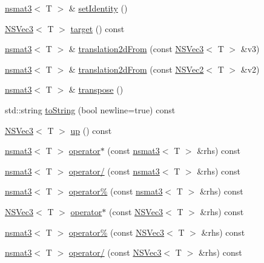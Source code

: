 \begin{DoxyCompactItemize}
\item 
\hyperlink{structnsmat3}{nsmat3}$<$ T $>$ \& \hyperlink{structnsmat3_a7493076bf442d798748ef5eae2d7d981}{set\-Identity} ()
\item 
\hyperlink{structNSVec3}{N\-S\-Vec3}$<$ T $>$ \hyperlink{structnsmat3_afa4d115852694f7da5b693a5ab52da8e}{target} () const 
\item 
\hyperlink{structnsmat3}{nsmat3}$<$ T $>$ \& \hyperlink{structnsmat3_a0ba7b5656e167d41176fd3bfc8b956fa}{translation2d\-From} (const \hyperlink{structNSVec3}{N\-S\-Vec3}$<$ T $>$ \&v3)
\item 
\hyperlink{structnsmat3}{nsmat3}$<$ T $>$ \& \hyperlink{structnsmat3_ac4d5172fb1936e1de9f8a34eb43c82dc}{translation2d\-From} (const \hyperlink{structNSVec2}{N\-S\-Vec2}$<$ T $>$ \&v2)
\item 
\hyperlink{structnsmat3}{nsmat3}$<$ T $>$ \& \hyperlink{structnsmat3_acb03f6c3876937eb0b8e3eac7225a16d}{transpose} ()
\item 
std\-::string \hyperlink{structnsmat3_a429c08006127a30402dee22058586d3a}{to\-String} (bool newline=true) const 
\item 
\hyperlink{structNSVec3}{N\-S\-Vec3}$<$ T $>$ \hyperlink{structnsmat3_a7b40dc42657fa77c98309d9c59c3777d}{up} () const 
\item 
\hyperlink{structnsmat3}{nsmat3}$<$ T $>$ \hyperlink{structnsmat3_ab55440da9761073332ea7282f597acc0}{operator$\ast$} (const \hyperlink{structnsmat3}{nsmat3}$<$ T $>$ \&rhs) const 
\item 
\hyperlink{structnsmat3}{nsmat3}$<$ T $>$ \hyperlink{structnsmat3_a051dc6ca983885d92527b7cfba1fac96}{operator/} (const \hyperlink{structnsmat3}{nsmat3}$<$ T $>$ \&rhs) const 
\item 
\hyperlink{structnsmat3}{nsmat3}$<$ T $>$ \hyperlink{structnsmat3_adc3b9a00638048a15545d963229d1190}{operator\%} (const \hyperlink{structnsmat3}{nsmat3}$<$ T $>$ \&rhs) const 
\item 
\hyperlink{structNSVec3}{N\-S\-Vec3}$<$ T $>$ \hyperlink{structnsmat3_a85648a3ec6c5d057816cd743a40db97a}{operator$\ast$} (const \hyperlink{structNSVec3}{N\-S\-Vec3}$<$ T $>$ \&rhs) const 
\item 
\hyperlink{structnsmat3}{nsmat3}$<$ T $>$ \hyperlink{structnsmat3_a0982e460e29c02e6796881f63276e315}{operator\%} (const \hyperlink{structNSVec3}{N\-S\-Vec3}$<$ T $>$ \&rhs) const 
\item 
\hyperlink{structnsmat3}{nsmat3}$<$ T $>$ \hyperlink{structnsmat3_a11927ed68f9d528430c4fcffc33542e0}{operator/} (const \hyperlink{structNSVec3}{N\-S\-Vec3}$<$ T $>$ \&rhs) const 

\end{DoxyCompactItemize}

